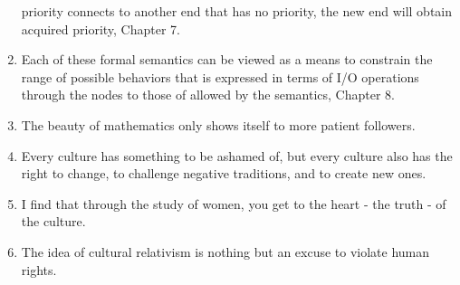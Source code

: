 \begin{enumerate}
priority connects to another end that has no priority, the new end will obtain
acquired priority, Chapter 7.
\item Each of these formal semantics can be viewed as a means to constrain the
range of possible behaviors that is expressed in terms of I/O operations through
the nodes to those of allowed by the semantics, Chapter 8.
\item The beauty of mathematics only shows itself to more patient followers.
\item Every culture has something to be ashamed of, but every culture also has the right to change, to challenge negative traditions, and to create new ones.
\item I find that through the study of women, you get to the heart - the truth - of the culture.
\item The idea of cultural relativism is nothing but an excuse to violate human rights.
\end{enumerate}
